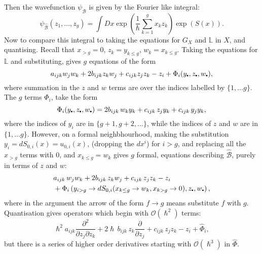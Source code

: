     Then the wavefunction \(\psi_{\widehat{\mathcal{B}}}\) is given by the Fourier like integral:
    \[ \psi_{\widehat{\mathcal{B}}}(z_1, \dots, z_g) = \int Dx  \exp\left(\frac{1}{\hslash} \sum_{k=1}^g x_k z_k \right) \exp(S(x)). \]
    Now to compare this integral to taking the equations for \(G_X\) and \( \mathbb{L}\) in \(X\), and quantising. Recall that \( x_{>g} = 0\), \( z_k = y_{k\leq g } \), \( w_k = x_{k\leq g} \). Taking the equations for \( \mathbb{L}\) and substituting, gives \(g\) equations of the form
    \begin{equation} a_{ijk}w_j w_k + 2 b_{ijk}z_k w_j + c_{ijk}z_j z_k - z_i   +  \Phi_i(y_{\sbt},z_{\sbt},w_{\sbt})   , 
    \end{equation}
    where summation in the \(z\) and \(w\) terms are over the indices labelled by \( \{1,\dots g\}\). The \(g\) terms \( \Phi_i\), take the form
    \[\Phi_i(y_{\sbt},z_{\sbt},w_{\sbt}) = 2 b_{ijk}\, w_k y_k  + c_{ijk} \, z_j y_k + c_{ijk} \, y_j y_k ,\]
    where the indices of \(y_{i}\) are in \(\{g+1,g+2,\dots \}\), while the indices of \(z\) and \(w\) are in \( \{1,\dots g\}\). 
    However, on a formal neighbhourhood, making the substitution \(y_i =  dS_{0,i}(x) = u_{0,i}(x)\), (dropping the \(dx^i\)) for \(i >g\), and replacing all the \(x_{>g}\) terms with \(0\), and \( x_{k \leq g} = w_{k}\) gives \(g\) formal, equations describing \( \widehat{\mathcal{B}}\), purely in terms of \(z\) and \(w\):
    \begin{align*} 
    & a_{ijk} \, w_j w_k + 2 b_{ijk} \, z_k w_j + c_{ijk} \, z_j z_k - z_i  \\    
    & +  \Phi_i\left(y_{i>g}\rightarrow dS_{0,i}(x_{k\leq g}\rightarrow w_{k},x_{k>g} \rightarrow 0),z_{\sbt},w_{\sbt}\right) ,
    \end{align*}
    where in the argument the arrow of the form \( f \rightarrow g \) means substitute \(f\) with \(g\). Quantisation gives operators which begin with \( \mathcal{O}(\hslash^2)\) terms:
    \[ \hslash^2 a_{ijk} \frac{\partial^2}{\partial z_j \partial z_k} + 2 \hslash \, b_{ijk}\,  z_k \frac{\partial}{\partial z_j} + c_{ijk}\, z_j z_k - z_i + \widehat{\Phi}_i,  \]
    but there is a series of higher order derivatives starting with \( \mathcal{O}(\hslash^3)\) in \( \widehat{\Phi}\).
    
